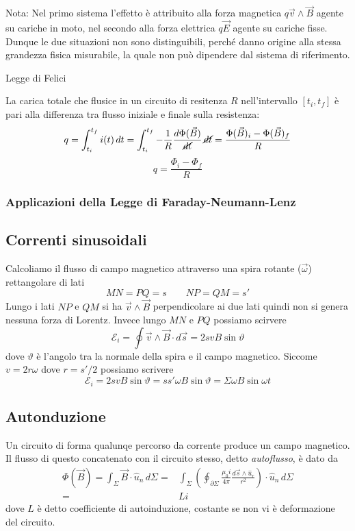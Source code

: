 \documentclass[x11names]{report}
\newcommand{\teorema}[2]{
	\begin{center}
		\fboxsep11pt
		\colorbox{myred}{\begin{minipage}{5.75in}
				\begin{redes}{#1}
					#2
				\end{redes}
		\end{minipage}}
	\end{center}
}
\newcommand{\nota}[2]{
	\begin{attenzione}{Nota:}
		#2
	\end{attenzione}
}
\begin{document}
\nota{}{Nel primo sistema l’effetto è attribuito alla forza magnetica \(q \vec{v}\wedge \vec{B}\) agente su cariche in moto, nel secondo alla forza elettrica \(q\vec{E}\) agente su cariche fisse. Dunque le due situazioni non sono distinguibili, perché danno origine alla stessa grandezza fisica misurabile, la quale non può dipendere dal sistema di riferimento.}

\teorema{Legge di Felici}{
La carica totale che flusice in un circuito di resitenza \(R\) nell'intervallo \([t_i,t_f]\) è pari alla differenza tra flusso iniziale e finale sulla resistenza:
\[
q = \int_{t_i}^{t_f} i(t) \, dt = \int_{t_i}^{t_f} -\frac{1}{R}\frac{d\Phi(\vec{B})}{\cancel{dt}} \, \cancel{dt} = \frac{\Phi(\vec{B})_i - \Phi(\vec{B})_f}{R}
\]
\begin{equation}
	q = \frac{\Phi_i - \Phi_f}{R}
\end{equation}
}

\subsubsection{Applicazioni della Legge di Faraday-Neumann-Lenz}

\subsection{Correnti sinusoidali}
Calcoliamo il flusso di campo magnetico attraverso una spira rotante (\(\vec
\omega\)) rettangolare di lati 
\[
MN = PQ = s \qquad NP = QM = s'
\]
Lungo i lati \(NP\) e \(QM\) si ha \(\vec{v}\wedge\vec{B}\) perpendicolare ai due lati quindi non si genera nessuna forza di Lorentz. Invece lungo \(MN\) e \(PQ\) possiamo scirvere
\[
\mathcal{E}_i = \oint \vec{v}\wedge\vec{B} \cdot d\vec{s} = 2svB\sin\vartheta
\]
dove \(\vartheta\) è l'angolo tra la normale della spira e il campo magnetico. Siccome \(v=2r\omega\) dove \(r = s'/2\) possiamo scrivere
\[
\mathcal{E}_i = 2svB\sin\vartheta = ss'\omega B\sin\vartheta = \Sigma \omega B\sin\omega t
\]

\subsection{Autonduzione}
Un circuito di forma qualunqe percorso da corrente produce un campo magnetico. Il flusso di questo concatenato con il circuito stesso, detto \textit{autoflusso}, è dato da 
\begin{align*}
	\Phi(\vec{B}) = \int_\Sigma \vec{B}\cdot \hat{u}_n \, d\Sigma =& \int_\Sigma \left(\oint_{\partial\Sigma} \frac{\mu_0 i}{4\pi}\frac{d\vec{s}\wedge\hat{u}_r}{r^2}\right) \cdot \hat{u}_n \, d\Sigma \\
	=& Li
\end{align*}
dove \(L\) è detto coefficiente di autoinduzione, costante se non vi è deformazione del circuito. 
\end{document}
